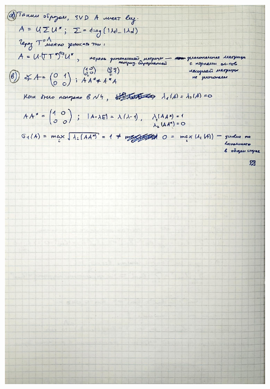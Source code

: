 \documentclass{article}
\begin{document}
		\begin{figure}[h!]
			\includegraphics[width=0.95\linewidth]{handwritten/matcomp_hw1_7b}
		\end{figure}
		
\end{document}
